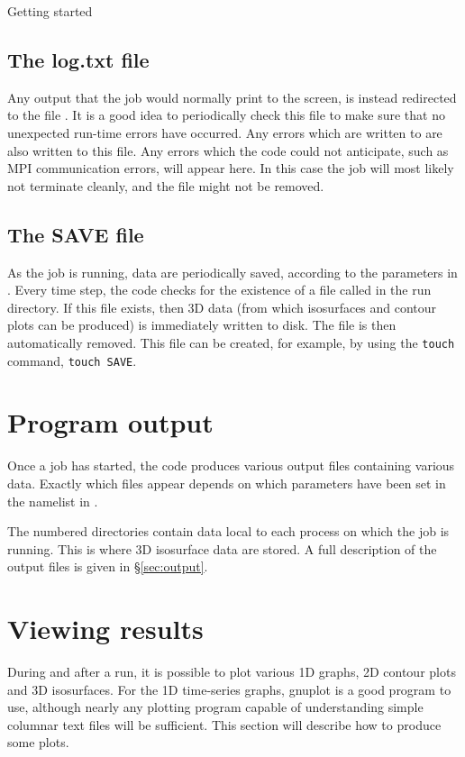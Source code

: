\begin{chapter}{\label{cha:quickstart}Getting started}
  \subsection{The log.txt file}
  Any output that the job would normally print to the screen, is instead
  redirected to the file .  It is a good idea to periodically
  check this file to make sure that no unexpected run-time errors have
  occurred.  Any errors which are written to  are also written
  to this file.  Any errors which the code could not anticipate, such as MPI
  communication errors, will appear here.  In this case the job will most
  likely not terminate cleanly, and the  file might not be
  removed.

  \subsection{The SAVE file}
  As the job is running, data are periodically saved, according to the
   parameters in .  Every time step, the
  code checks for the existence of a file called  in the run
  directory.  If this file exists, then 3D data (from which isosurfaces and
  contour plots can be produced) is immediately written to disk.  The
   file is then automatically removed.  This file can be created,
  for example, by using the \verb"touch" command, \ie \verb"touch SAVE".

  \section{Program output}
  Once a job has started, the code produces various output files containing
  various data.  Exactly which files appear depends on which parameters have
  been set in the  namelist in .

  The numbered  directories contain data local to each process on
  which the job is running.  This is where 3D isosurface data are stored.  A
  full description of the output files is given in \S\ref{sec:output}.

  \section{\label{sec:viewing_results}Viewing results}
  During and after a run, it is possible to plot various 1D graphs, 2D contour
  plots and 3D isosurfaces.  For the 1D time-series graphs, gnuplot is a good
  program to use, although nearly any plotting program capable of understanding
  simple columnar text files will be sufficient.  This section will describe
  how to produce some plots.
  

\end{chapter}
